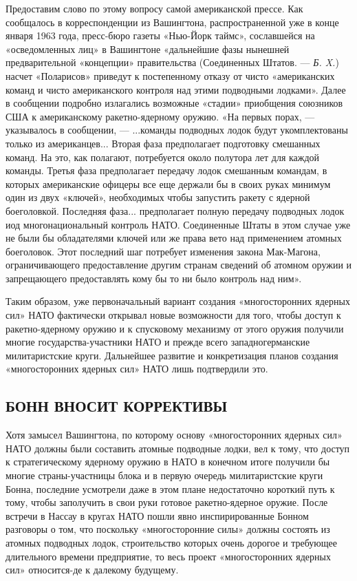 \documentclass[12pt, a4paper, openany]{book}
\begin{document}
Предоставим слово по этому вопросу самой американской прессе. Как сообщалось в корреспонденции из Вашингтона, распространенной уже в конце января 1963 года, пресс-бюро газеты «Нью-Йорк таймс», сославшейся на «осведомленных лиц» в Вашингтоне «дальнейшие фазы нынешней предварительной «концепции» правительства (Соединенных Штатов. — \textit{Б. X.}) насчет «Поларисов» приведут к постепенному отказу от чисто «американских команд и чисто американского контроля над этими подводными лодками». Далее в сообщении подробно излагались возможные «стадии» приобщения союзников США к американскому ракетно-ядерному оружию. «На первых порах, — указывалось в сообщении, — ...команды подводных лодок будут укомплектованы только из американцев... Вторая фаза предполагает подготовку смешанных команд. На это, как полагают, потребуется около полутора лет для каждой команды. Третья фаза предполагает передачу лодок смешанным командам, в которых американские офицеры все еще держали бы в своих руках минимум один из двух «ключей», необходимых чтобы запустить ракету с ядерной боеголовкой. Последняя фаза... предполагает полную передачу подводных лодок иод многонациональный контроль НАТО. Соединенные Штаты в этом случае уже не были бы обладателями ключей или же права вето над применением атомных боеголовок. Этот последний шаг потребует изменения закона Мак-Магона, ограничивающего предоставление другим странам сведений об атомном оружии и запрещающего предоставлять кому бы то ни было контроль над ним».

Таким образом, уже первоначальный вариант создания «многосторонних ядерных сил» НАТО фактически открывал новые возможности для того, чтобы доступ к ракетно-ядерному оружию и к спусковому механизму от этого оружия получили многие государства-участники НАТО и прежде всего западногерманские милитаристские круги. Дальнейшее развитие и конкретизация планов создания «многосторонних ядерных сил» НАТО лишь подтвердили это.

	\subsection[Бонн вносит коррективы]{\center БОНН ВНОСИТ КОРРЕКТИВЫ}


Хотя замысел Вашингтона, по которому основу «многосторонних ядерных сил» НАТО должны были составить атомные подводные лодки, вел к тому, что доступ к стратегическому ядерному оружию в НАТО в конечном итоге получили бы многие страны-участницы блока и в первую очередь милитаристские круги Бонна, последние усмотрели даже в этом плане недостаточно короткий путь к тому, чтобы заполучить в свои руки готовое ракетно-ядерное оружие. После встречи в Нассау в кругах НАТО пошли явно инспирированные Бонном разговоры о том, что поскольку «многосторонние силы» должны состоять из атомных подводных лодок, строительство которых очень дорогое и требующее длительного времени предприятие, то весь проект «многосторонних ядерных сил» относится-де к далекому будущему.
\end{document}
